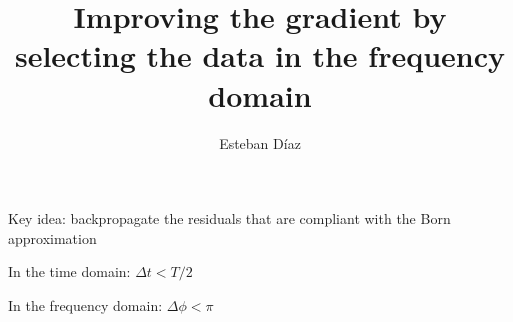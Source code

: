 

\title[]{Improving the gradient by selecting the data in the 
frequency domain}
\subtitle{}
\author[]{Esteban D\'{i}az}
\date{}
\logo{}



\Large

\def\big#1{\begin{center} \LARGE \textbf{#1} \end{center}}
\def\cen#1{\begin{center}        \textbf{#1} \end{center}}

 { \cwpcover }


\begin{frame}
 
  Key idea: backpropagate the residuals that are compliant with the Born approximation

\centering
\vfill
  In the time domain:   
    $\Delta t < T/2$

  In the frequency domain:
    $ \Delta \phi < \pi$ 
\end{frame}

\begin{frame}
\end{frame}

\begin{frame} 
  \centering
\end{frame}

\begin{frame}
\end{frame}



\begin{frame}
\end{frame}


\begin{frame}
  \begin{columns}
  \end{columns}
\end{frame}



\begin{frame}
\end{frame}

